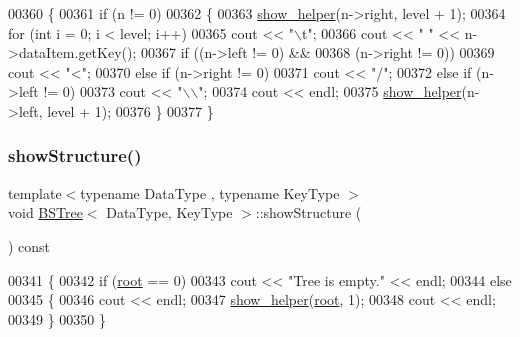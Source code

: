 \begin{DoxyCode}
00360 \{
00361     \textcolor{keywordflow}{if} (n != 0)
00362     \{
00363         \hyperlink{class_b_s_tree_a735864f670b952c5bb2bc2550ade3a72}{show\_helper}(n->right, level + 1);         
00364         \textcolor{keywordflow}{for} (\textcolor{keywordtype}{int} i = 0; i < level; i++)    
00365             cout << \textcolor{stringliteral}{"\(\backslash\)t"};
00366         cout << \textcolor{stringliteral}{" "} << n->dataItem.getKey();   
00367         \textcolor{keywordflow}{if} ((n->left != 0) &&          
00368             (n->right != 0))
00369             cout << \textcolor{stringliteral}{"<"};
00370         \textcolor{keywordflow}{else} \textcolor{keywordflow}{if} (n->right != 0)
00371             cout << \textcolor{stringliteral}{"/"};
00372         \textcolor{keywordflow}{else} \textcolor{keywordflow}{if} (n->left != 0)
00373             cout << \textcolor{stringliteral}{"\(\backslash\)\(\backslash\)"};
00374         cout << endl;
00375         \hyperlink{class_b_s_tree_a735864f670b952c5bb2bc2550ade3a72}{show\_helper}(n->left, level + 1);          
00376     \}
00377 \}
\end{DoxyCode}
\hypertarget{class_b_s_tree_a66690333188606d533e4ad182922d9e1}{}\label{class_b_s_tree_a66690333188606d533e4ad182922d9e1} 
\subsubsection{\texorpdfstring{show\+Structure()}{showStructure()}}
{\footnotesize\ttfamily template$<$typename Data\+Type , typename Key\+Type $>$ \\
void \hyperlink{class_b_s_tree}{B\+S\+Tree}$<$ Data\+Type, Key\+Type $>$\+::show\+Structure (\begin{DoxyParamCaption}{ }\end{DoxyParamCaption}) const}


\begin{DoxyCode}
00341 \{
00342     \textcolor{keywordflow}{if} (\hyperlink{class_b_s_tree_a83534afce9094181ac031f9f596a8625}{root} == 0)
00343         cout << \textcolor{stringliteral}{"Tree is empty."} << endl;
00344     \textcolor{keywordflow}{else}
00345     \{
00346         cout << endl;
00347         \hyperlink{class_b_s_tree_a735864f670b952c5bb2bc2550ade3a72}{show\_helper}(\hyperlink{class_b_s_tree_a83534afce9094181ac031f9f596a8625}{root}, 1);
00348         cout << endl;
00349     \}
00350 \}
\end{DoxyCode}
\hypertarget{class_b_s_tree_af3a79c41f7799cf123438f9449cf3ebb}{}\label{class_b_s_tree_af3a79c41f7799cf123438f9449cf3ebb} 
